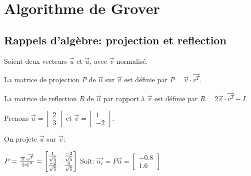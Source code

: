 \chapter{Algorithme de Grover}

\section{Rappels d'algèbre: projection et reflection}

Soient deux vecteurs $\overrightarrow{u}$ et $\overrightarrow{u}$, avec $\overrightarrow{v}$ normalisé.

\begin{definition}
  La matrice de projection $P$ de $\overrightarrow{u}$ sur $\overrightarrow{v}$ est définie par $P = \overrightarrow{v} \cdot \overrightarrow{v^T}$.
\end{definition}

\begin{definition}
  La matrice de reflection $R$ de $\overrightarrow{u}$ par rapport à $\overrightarrow{v}$ est définie par $R = 2 \overrightarrow{v} \cdot \overrightarrow{v^T} - I$.
\end{definition}

\begin{ex}
Prenons $\overrightarrow{u}=\begin{bmatrix}2\\3\end{bmatrix}$ et $\overrightarrow{v}=\begin{bmatrix}1\\-2\end{bmatrix}$.

On projete $\overrightarrow{u}$ sur $\overrightarrow{v}$:

$P = \frac{\overrightarrow{v} \cdot \overrightarrow{v^T}}{\left\lVert v\right\rVert^2} = \begin{bmatrix}\frac{1}{\sqrt{5}} & \frac{-2}{\sqrt{5}}\\\frac{-2}{\sqrt{5}} & \frac{4}{\sqrt{5}}\end{bmatrix}$
\medbreak
Soit: $\overrightarrow{u_v} = P\overrightarrow{u} = \begin{bmatrix}-0.8\\1.6\end{bmatrix}$
\end{ex}

